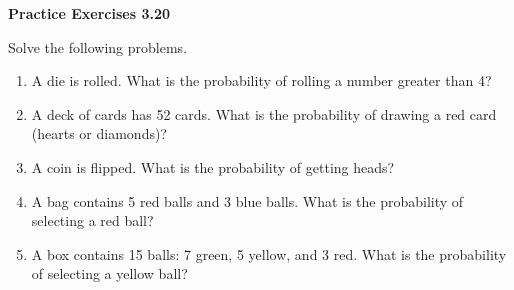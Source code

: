 \vspace{0.3ex}
\noindent\textbf{Practice Exercises 3.20}

\vspace{0.2ex}

Solve the following problems.

\begin{enumerate}[label=\color{blue}\arabic*.]
    \item A die is rolled. What is the probability of rolling a number greater than 4?
    \item A deck of cards has 52 cards. What is the probability of drawing a red card (hearts or diamonds)?
    \item A coin is flipped. What is the probability of getting heads?
    \item A bag contains 5 red balls and 3 blue balls. What is the probability of selecting a red ball?
    \item A box contains 15 balls: 7 green, 5 yellow, and 3 red. What is the probability of selecting a yellow ball?
\end{enumerate}
